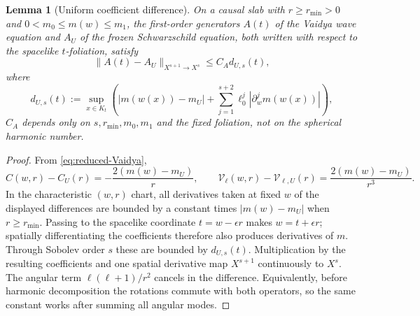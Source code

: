 \documentclass[11pt,a4paper]{article}
\newtheorem{lemma}[theorem]{Lemma}
\theoremstyle{definition}
\theoremstyle{remark}
\begin{document}
	\begin{lemma}[Uniform coefficient difference]
		\label{lem:coefficient-difference}
		On a causal slab with $r\geq r_{\min}>0$ and
		$0<m_0\leq m(w)\leq m_1$, the first-order generators $A(t)$ of the Vaidya
		wave equation and $A_U$ of the frozen Schwarzschild equation, both written
		with respect to the spacelike $t$-foliation, satisfy
		\begin{equation}
			\|A(t)-A_U\|_{X^{s+1}\to X^s}
			\leq C_A d_{U,s}(t),
			\label{eq:generator-difference}
		\end{equation}
		where
		\begin{equation}
			d_{U,s}(t):=\sup_{x\in K_t}
			\left(|m(w(x))-m_U|+
			\sum_{j=1}^{s+2}\ell_0^j
			|\partial_w^jm(w(x))|\right),
		\end{equation}
		$C_A$ depends only on $s,r_{\min},m_0,m_1$ and the fixed foliation, not
		on the spherical harmonic number.
	\end{lemma}
	
	\begin{proof}
		From \eqref{eq:reduced-Vaidya},
		\begin{equation}
			C(w,r)-C_U(r)=-\frac{2(m(w)-m_U)}r,
			\qquad
			\mathcal V_\ell(w,r)-\mathcal V_{\ell,U}(r)
			=\frac{2(m(w)-m_U)}{r^3}.
			\label{eq:explicit-coefficient-difference}
		\end{equation}
		In the characteristic $(w,r)$ chart, all derivatives taken at fixed $w$ of
		the displayed differences are bounded by a constant times
		$|m(w)-m_U|$ when $r\geq r_{\min}$.  Passing to the spacelike coordinate
		$t=w-\epsilon r$ makes $w=t+\epsilon r$; spatially differentiating the
		coefficients therefore also produces derivatives of $m$.  Through Sobolev
		order $s$ these are bounded by $d_{U,s}(t)$.  Multiplication by the resulting
		coefficients and one spatial derivative map $X^{s+1}$ continuously to $X^s$.  The angular term
		$\ell(\ell+1)/r^2$ cancels in the difference.  Equivalently, before harmonic
		decomposition the rotations commute with both operators, so the same constant
		works after summing all angular modes.
	\end{proof}
	
\end{document}
